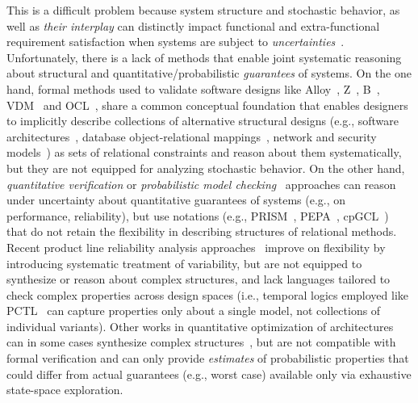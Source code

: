 \documentclass[10pt,journal,compsoc]{IEEEtran}
\begin{document}
 This is a difficult problem because system structure and stochastic behavior, as well as {\em their interplay} can distinctly impact functional and extra-functional requirement satisfaction when systems are subject to {\em uncertainties}~\cite{DBLP:conf/icse/EsfahaniMR13,DBLP:journals/tse/BroschKBR12,Perez-Palacin:2014:UMS:2568088.2568095}. 
 Unfortunately, there is a lack of methods that enable joint systematic reasoning about structural and quantitative/probabilistic {\em guarantees} of systems.
 On the one hand, formal methods used to validate software designs like Alloy~\cite{DBLP:journals/tosem/Jackson02}, Z~\cite{DBLP:books/daglib/0068766}, B~\cite{DBLP:conf/fm/AbrialLNSS91}, VDM~\cite{DBLP:conf/msi/Bjorner78} and OCL~\cite{Warmer:2003:OCL:861416}, share a common conceptual foundation that enables designers to implicitly describe collections of alternative structural designs (e.g., software architectures~\cite{DBLP:conf/sigsoft/MaozRR13,4492876}, database object-relational mappings~\cite{DBLP:conf/icse/BagheriTS14}, network and security models~\cite{DBLP:conf/fm/Zave05,DBLP:journals/tse/BagheriSGM15}) as sets of relational constraints and reason about them systematically, but they are not equipped for analyzing stochastic behavior. 
 On the other hand, {\em quantitative verification} or {\em probabilistic model checking}~\cite{DBLP:conf/sfm/KwiatkowskaNP07,DBLP:journals/cacm/CalinescuGKM12,DBLP:conf/icse/FilieriGT11} approaches can reason under uncertainty about quantitative guarantees of systems (e.g., on performance, reliability), but use notations (e.g., PRISM~\cite{DBLP:conf/cav/KwiatkowskaNP11}, PEPA~\cite{DBLP:conf/cpe/GilmoreH94}, cpGCL~\cite{JIFENG1997171}) that do not retain the flexibility in describing structures of relational methods. Recent product line reliability analysis approaches~\cite{DBLP:journals/infsof/GhezziS13, Chrszon2017, DBLP:journals/scp/CastroLATAS18,DBLP:journals/infsof/LannaCARSA18} improve on flexibility by introducing systematic treatment of variability, but are not equipped to synthesize or reason about complex structures, and lack languages tailored to check complex properties across design spaces (i.e., temporal logics employed like PCTL~\cite{DBLP:conf/sfm/KwiatkowskaNP07} can capture properties only about a single model, not collections of individual variants). 
 Other works in quantitative optimization of architectures~\cite{DBLP:journals/jss/GrunskeA13,DBLP:conf/icse/EsfahaniMR13,5069138,DBLP:conf/qosa/MeedeniyaMAG11,Martens:2010:AIS:1712605.1712624,Bondarev:2007:EPT:1216993.1217020,DBLP:journals/jss/BeckerKR09,DBLP:journals/tse/BroschKBR12,DBLP:conf/itng/DwivediGPS14,DBLP:conf/icse/BagheriTS14} can in some cases synthesize complex structures~\cite{DBLP:conf/itng/DwivediGPS14,DBLP:conf/icse/BagheriTS14}, but are not compatible with formal verification and can only provide {\em estimates} of probabilistic properties that could differ from actual guarantees (e.g., worst case) available only via exhaustive state-space exploration.
 
\end{document}
